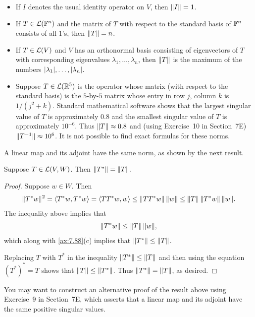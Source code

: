 \begin{example}[Norms]\label{ax:7.90}\leavevmode
\begin{itemize}
\item If $I$ denotes the usual identity operator on $V$, then $\lVert I \rVert=1$.
\item If $T\in\mathcal{L}(\mathbb{F}^n)$ and the matrix of $T$ with respect to the standard
  basis of $\mathbb{F}^n$ consists of all $1$'s, then $\lVert T \rVert=n$.
\item If $T\in\mathcal{L}(V)$ and $V$ has an orthonormal basis consisting of
  eigenvectors of $T$ with corresponding eigenvalues
  $\lambda_1,\dots,\lambda_n$, then $\lVert T \rVert$ is the maximum of the numbers
  $\lvert \lambda_1 \rvert,\dots,\lvert \lambda_n \rvert$.
\item Suppose $T\in\mathcal{L}(\mathbb{R}^5)$ is the operator whose matrix (with respect to
  the standard basis) is the $5$-by-$5$ matrix whose entry in row $j$, column
  $k$ is $1/(j^2+k)$. Standard mathematical software shows that the largest
  singular value of $T$ is approximately $0.8$ and the smallest singular value
  of $T$ is approximately $10^{-6}$. Thus $\lVert T \rVert\approx0.8$ and (using
  Exercise~10 in Section~7E) $\lVert T^{-1} \rVert\approx10^6$. It is not possible to
  find exact formulas for these norms.
\end{itemize}
\end{example}

A linear map and its adjoint have the same norm, as shown by the next result.

\begin{result}\label{ax:7.91}
Suppose $T\in\mathcal{L}(V,W)$. Then $\lVert T^* \rVert=\lVert T \rVert$.
\end{result}

\begin{proof}
Suppose $w\in W$. Then
\[ \lVert T^*w \rVert^2 = \langle T^*w, T^*w \rangle = \langle TT^*w, w \rangle \le \lVert TT^*w \rVert\,\lVert w \rVert
   \le \lVert T \rVert\,\lVert T^*w \rVert\,\lVert w \rVert. \]
The inequality above implies that
\[ \lVert T^*w \rVert\le\lVert T \rVert\,\lVert w \rVert, \]
which along with \ref{ax:7.88}(c) implies that $\lVert T^* \rVert\le\lVert T \rVert$.

Replacing $T$ with $T^*$ in the inequality $\lVert T^* \rVert\le\lVert T \rVert$ and then
using the equation $(T^*)^*=T$ shows that $\lVert T \rVert\le\lVert T^* \rVert$. Thus
$\lVert T^* \rVert=\lVert T \rVert$, as desired.
\end{proof}

You may want to construct an alternative proof of the result above using
Exercise~9 in Section~7E, which asserts that a linear map and its adjoint have
the same positive singular values.

